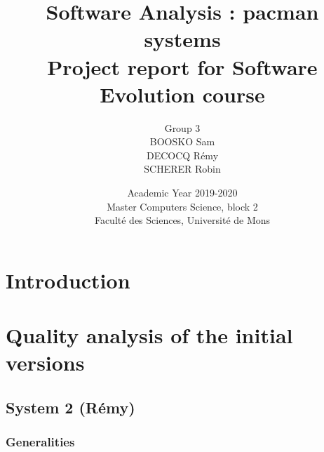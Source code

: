 \documentclass[]{article}
\begin{document}
\title{
\vspace{1.6cm}
{\Huge Software Analysis : pacman systems}\\
\vspace{0.5cm}
{\Huge Project report for Software Evolution course}\vspace{1cm}\\
}


\author{
\vspace{1cm}
\huge{Group 3}\\
\Large{BOOSKO Sam}\\
\Large{DECOCQ Rémy}\\
\Large{SCHERER Robin}
}


\date{
\vspace{7.9cm}
Academic Year 2019-2020\\
Master Computers Science, block 2\\
Faculté des Sciences, Université de Mons}

\maketitle          

\thispagestyle{empty}   

\newpage

\tableofcontents
\newpage

\section*{Introduction}
\newpage
\section{Quality analysis of the initial versions}

\subsection{System 2 (Rémy)}
\subsubsection{Generalities}
\end{document}
